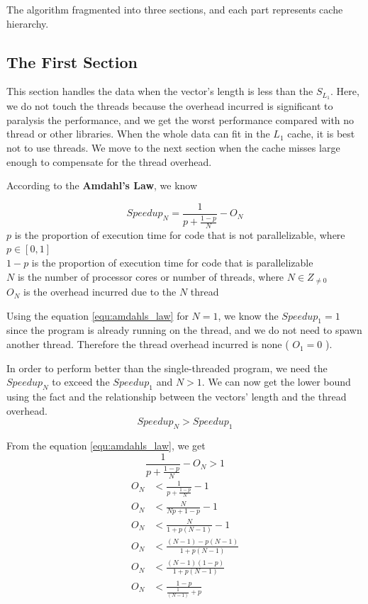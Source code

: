The algorithm fragmented into three sections, and each part represents cache hierarchy.

\subsection{The First Section}

This section handles the data when the vector's length is less than the $S_{L_1}$. 
Here, we do not touch the threads because the overhead incurred is significant 
to paralysis the performance, and we get the worst performance compared with no 
thread or other libraries. When the whole data can fit in the $L_1$ cache, 
it is best not to use threads. We move to the next section when the cache 
misses large enough to compensate for the thread overhead.

According to the \textbf{Amdahl's Law}, we know

\begin{equation}
    Speedup_N = \frac{1}{ p + \frac{1 - p}{N} } - O_N
    \label{equ:amdahls_law}
\end{equation}
$p$ is the proportion of execution time for code that is not parallelizable, where $p \in [0,1]$ \\
$1 - p$ is the proportion of execution time for code that is parallelizable \\
$N$ is the number of processor cores or number of threads, where $N \in Z_{\ne 0}$ \\
$O_N$ is the overhead incurred due to the $N$ thread

Using the equation \ref{equ:amdahls_law}  for $N = 1$, we know the $Speedup_1 = 1$ since 
the program is already running on the thread, and we do not need to spawn another thread. 
Therefore the thread overhead incurred is none ( $O_1 = 0$ ).

In order to perform better than the single-threaded program, 
we need the $Speedup_N$ to exceed the $Speedup_1$ and $N > 1$. 
We can now get the lower bound using the fact and the 
relationship between the vectors' length and the thread overhead.
\[Speedup_N > Speedup_1\]

From the equation \ref{equ:amdahls_law}, we get
\[\frac{1}{ p + \frac{1 - p}{N} } - O_N > 1\]
\begin{align*}
O_N &< \frac{1}{ p + \frac{1 - p}{N} } - 1\\
O_N &< \frac{N}{ Np + 1 - p } - 1\\
O_N &< \frac{N}{ 1 + p(N - 1) } - 1\\
O_N &< \frac{(N - 1) - p(N - 1)}{ 1 + p(N - 1) }\\
O_N &< \frac{(N - 1)(1 - p)}{ 1 + p(N - 1) }\\
O_N &< \frac{1 - p}{ \frac{1}{(N - 1)} + p }
\end{align*}

